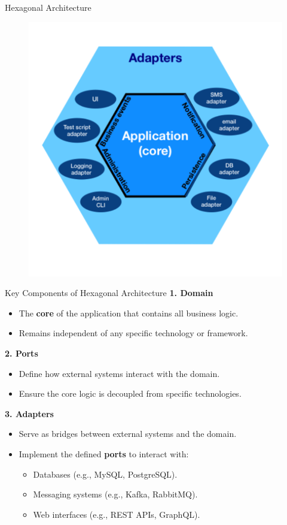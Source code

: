 \documentclass[aspectratio=169, table]{beamer}
\begin{document}
\begin{frame}[fragile]{Hexagonal Architecture}
	\vspace{20pt}
	\begin{figure}[h]
		\centering
		\includegraphics[width=.6\textwidth]{../images/hexagonal_architecture.png}
		\label{fig:hexagonal_architecture}
	\end{figure}
\end{frame}

\begin{frame}[fragile]{Key Components of Hexagonal Architecture}
	\vspace{20pt}
	\textbf{1. Domain}  
	\begin{itemize}
		\item The \textbf{core} of the application that contains all business logic.
		\item Remains independent of any specific technology or framework.
	\end{itemize}
	
	\textbf{2. Ports}  
	\begin{itemize}
		\item Define how external systems interact with the domain.
		\item Ensure the core logic is decoupled from specific technologies.
	\end{itemize}
	
	\textbf{3. Adapters}  
	\begin{itemize}
		\item Serve as bridges between external systems and the domain.
		\item Implement the defined \textbf{ports} to interact with:
		\begin{itemize}
			\item Databases (e.g., MySQL, PostgreSQL).
			\item Messaging systems (e.g., Kafka, RabbitMQ).
			\item Web interfaces (e.g., REST APIs, GraphQL).
		\end{itemize}
	\end{itemize}
\end{frame}
\end{document}
